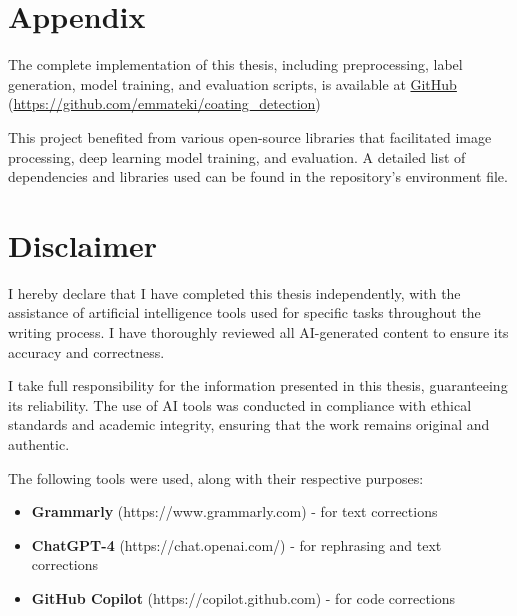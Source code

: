 \chapter{Appendix}

The complete implementation of this thesis, including preprocessing, label generation, model training, and evaluation scripts, is available at \href{https://github.com/emmateki/coating_detection}{GitHub} (\url{https://github.com/emmateki/coating_detection})


This project benefited from various open-source libraries that facilitated image processing, deep learning model training, and evaluation. A detailed list of dependencies and libraries used can be found in the repository’s environment file.
\chapter{Disclaimer}
I hereby declare that I have completed this thesis independently, with the assistance of artificial intelligence tools used for specific tasks throughout the writing process. I have thoroughly reviewed all AI-generated content to ensure its accuracy and correctness.

I take full responsibility for the information presented in this thesis, guaranteeing its reliability. The use of AI tools was conducted in compliance with ethical standards and academic integrity, ensuring that the work remains original and authentic.

The following tools were used, along with their respective purposes:

\begin{itemize}
    \item \textbf{Grammarly} (https://www.grammarly.com) - for text corrections
    \item \textbf{ChatGPT-4} (https://chat.openai.com/) - for rephrasing and text corrections
    \item \textbf{GitHub Copilot} (https://copilot.github.com) - for code corrections
\end{itemize}


